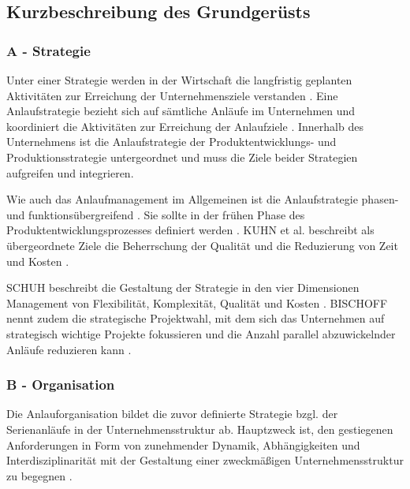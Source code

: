 \subsection*{Kurzbeschreibung des Grundgerüsts}

% 

\subsubsection*{A - Strategie}
Unter einer Strategie werden in der Wirtschaft die langfristig geplanten Aktivitäten zur Erreichung der Unternehmensziele verstanden \cite[12]{Schuh2008}. %
% 
Eine Anlaufstrategie bezieht sich auf sämtliche Anläufe im Unternehmen und koordiniert die Aktivitäten zur Erreichung der Anlaufziele \cite[4]{Schuh2008}. Innerhalb des Unternehmens ist die Anlaufstrategie der Produktentwicklungs- und Produktionsstrategie untergeordnet und muss die Ziele beider Strategien aufgreifen und integrieren. 
	

Wie auch das Anlaufmanagement im Allgemeinen ist die Anlaufstrategie phasen- und funktionsübergreifend \cite{Pfohl2000}. 
Sie sollte in der frühen Phase des Produktentwicklungsprozesses definiert werden \cite{Schuh2004}. 
KUHN et al. beschreibt als übergeordnete Ziele die Beherrschung der Qualität und die Reduzierung von Zeit und Kosten \cite[4]{Kuhn2002}. 

SCHUH beschreibt die Gestaltung der Strategie in den vier Dimensionen Management von Flexibilität, Komplexität, Qualität und Kosten \cite[13]{Schuh2008}. BISCHOFF nennt zudem die strategische Projektwahl, mit dem sich das Unternehmen auf strategisch wichtige Projekte fokussieren und die Anzahl parallel abzuwickelnder Anläufe reduzieren kann \cite[43]{Bischoff2007}. 

\subsubsection*{B - Organisation}
Die Anlauforganisation bildet die zuvor definierte Strategie bzgl. der Serienanläufe in der Unternehmensstruktur ab. Hauptzweck ist, den gestiegenen Anforderungen in Form von zunehmender Dynamik, Abhängigkeiten und Interdisziplinarität mit der Gestaltung einer zweckmäßigen Unternehmensstruktur zu begegnen \cite[55]{Schuh2008}. 

